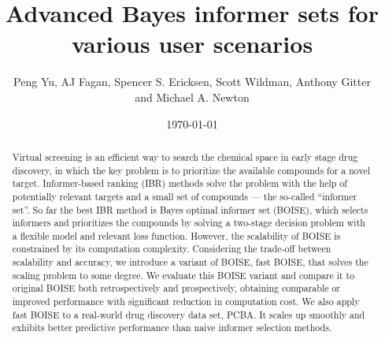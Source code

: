 \documentclass[11pt,a4paper]{article}
\title{Advanced Bayes informer sets for various user scenarios}
\author{
	Peng Yu, AJ Fagan, Spencer S. Ericksen, Scott Wildman, Anthony Gitter\\ and Michael A. Newton
}
\date{\today}
\theoremstyle{plain}
\begin{document}
\maketitle
\begin{abstract}
Virtual screening is an efficient way to search the chemical space in early stage drug discovery, in which the key problem is to prioritize the available compounds for a novel target.
Informer-based ranking (IBR) methods solve the problem with the help of potentially relevant targets and a small set of compounds --- the so-called ``informer set''. 
So far the best IBR method is Bayes optimal informer set (BOISE), which selects informers and prioritizes the compounds by solving a two-stage decision problem with a flexible model and relevant loss function. 
However, the scalability of BOISE is constrained by its computation complexity. Considering the trade-off between scalability and accuracy, we introduce a variant of BOISE, fast BOISE, that solves the scaling problem to some degree.
We evaluate this BOISE variant and compare it to original BOISE both retrospectively and prospectively, obtaining comparable or improved performance with significant reduction in computation cost. 
We also apply fast BOISE to a real-world drug discovery data set, PCBA.
It scales up smoothly and exhibits better predictive performance than naive informer selection methods.
\end{abstract}
\end{document}
